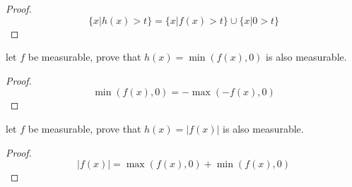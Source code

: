 \documentclass[11pt,a4paper]{article}
\begin{document}
\begin{proof}
    \[
        \{ x \vert h(x) > t \}  = \{ x \vert f(x) > t \} \cup \{ x \vert 0 > t \}
    \]
\end{proof}


\begin{exercise}
    let $f$ be measurable, prove that $h(x) = \min (f(x), 0)$ is also measurable.
\end{exercise}

\begin{proof}
    \[
        \min(f(x), 0) = - \max(-f(x), 0)
    \]
\end{proof}


\begin{exercise}
    let $f$ be measurable, prove that $h(x) = \lvert f(x)\rvert$ is also measurable.
\end{exercise}

\begin{proof}
    \[
\lvert f(x)\rvert = \max(f(x), 0) + \min(f(x), 0)
    \]
\end{proof}
\end{document}
